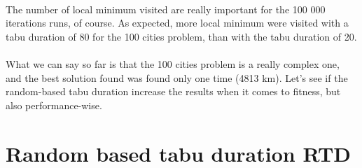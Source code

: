 \documentclass[12pt,oneside,a4paper]{article}
\begin{document}
\paragraph{}The number of local minimum visited are really important for the 100 000 iterations runs, 
of course. As expected, more local minimum were visited with a tabu duration of 80 for 
the 100 cities problem, than with the tabu duration of 20.
\paragraph{}What we can say so far is that the 100 cities problem is a really complex one, and the best 
solution found was found only one time (4813 km). Let’s see if the random-based tabu duration
 increase the results when it comes to fitness, but also performance-wise.

\section{Random based tabu duration RTD}
\end{document}
